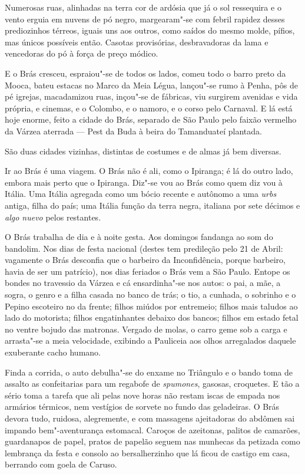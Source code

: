 Numerosas ruas, alinhadas na terra cor de ardósia que já o sol
ressequira e o vento erguia em nuvens de pó negro, margearam"-se com
febril rapidez desses prediozinhos térreos, iguais uns aos outros, como
saídos do mesmo molde, pífios, mas únicos possíveis então. Casotas
provisórias, desbravadoras da lama e vencedoras do pó à força de preço
módico.

E o Brás cresceu, espraiou"-se de todos os lados, comeu todo o barro
preto da Mooca, bateu estacas no Marco da Meia Légua, lançou"-se rumo à
Penha, pôs de pé igrejas, macadamizou ruas, inçou"-se de fábricas, viu
surgirem avenidas e vida própria, e cinemas, e o Colombo, e o namoro, e
o corso pelo Carnaval. E lá está hoje enorme, feito a cidade do Brás,
separado de São Paulo pelo faixão vermelho da Várzea aterrada --- Pest
da Buda à beira do Tamanduateí plantada.

São duas cidades vizinhas, distintas de costumes e de almas já bem
diversas.

Ir ao Brás é uma viagem. O Brás não é ali, como o Ipiranga; é lá do
outro lado, embora mais perto que o Ipiranga. Diz"-se vou ao Brás como
quem diz vou à Itália. Uma Itália agregada como um bócio recente e
autônomo a uma \emph{urbs} antiga, filha do país; uma Itália função da
terra negra, italiana por sete décimos e \emph{algo nuevo} pelos
restantes.

O Brás trabalha de dia e à noite gesta. Aos domingos fandanga ao som do
bandolim. Nos dias de festa nacional (destes tem predileção pelo 21 de
Abril: vagamente o Brás desconfia que o barbeiro da Inconfidência,
porque barbeiro, havia de ser um patrício), nos dias feriados o Brás vem
a São Paulo. Entope os bondes no travessio da Várzea e cá ensardinha"-se
nos autos: o pai, a mãe, a sogra, o genro e a filha casada no banco de
trás; o tio, a cunhada, o sobrinho e o Pepino escoteiro no da frente;
filhos miúdos por entremeio; filhos mais taludos ao lado do motorista;
filhos engatinhantes debaixo dos bancos; filhos em estado fetal no
ventre bojudo das matronas. Vergado de molas, o carro geme sob a carga e
arrasta"-se a meia velocidade, exibindo a Pauliceia aos olhos arregalados
daquele exuberante cacho humano.

Finda a corrida, o auto debulha"-se do enxame no Triângulo e o bando toma
de assalto as confeitarias para um regabofe de \emph{spumones}, gasosas,
croquetes. E tão a sério toma a tarefa que ali pelas nove horas não
restam iscas de empada nos armários térmicos, nem vestígios de sorvete
no fundo das geladeiras. O Brás devora tudo, ruidosa, alegremente, e com
massagens ajeitadoras do abdômen sai impando bem"-aventurança estomacal.
Caroços de azeitonas, palitos de camarões, guardanapos de papel, pratos
de papelão seguem nas munhecas da petizada como lembrança da festa e
consolo ao bersalherzinho que lá ficou de castigo em casa, berrando com
goela de Caruso.

